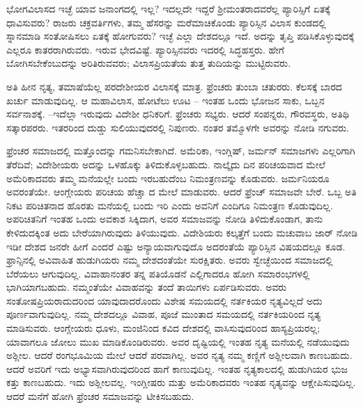 ಭೋಗವಿಲಾಸದ ಇಚ್ಛೆ ಯಾವ ಜನಾಂಗದಲ್ಲಿ ಇಲ್ಲ? ಇದಲ್ಲದೇ ಇದ್ದರೆ ಶ‍್ರೀಮಂತ\break ರಾದವರೆಲ್ಲ ಪ್ಯಾರಿಸ್ಸಿಗೆ ಏತಕ್ಕೆ ಧಾವಿಸುವರು? ರಾಜರು ಚಕ್ರವರ್ತಿಗಳು, ತಮ್ಮ ಹೆಸರನ್ನು ಮರೆಮಾಚಿಕೊಂಡು ಪ್ಯಾರಿಸ್ಸಿನ ವಿಲಾಸ ಕುಂಡದಲ್ಲಿ ಸ್ನಾನಮಾಡಿ ಸಂತೋಷಿಸಲು ಏತಕ್ಕೆ ಹೋಗುವರು? ಇಚ್ಛೆ ಎಲ್ಲಾ ದೇಶದಲ್ಲೂ ಇದೆ. ಅದನ್ನು ತೃಪ್ತಿ ಪಡಿಸಿಕೊಳ್ಳುವುದಕ್ಕೆ ಎಲ್ಲರೂ ಕಾತರರಾಗಿರುವರು. ಇರುವ ಭೇದವಿಷ್ಟೆ. ಪ್ಯಾರಿಸ್ಸಿನವರು ಇದರಲ್ಲಿ ಸಿದ್ಧಹಸ್ತರು. ಹೇಗೆ ಬೋಗಿಸಬೇಕೆಂಬುದನ್ನು ಅರಿತಿರುವವರು; ವಿಲಾಸಪ್ರಿಯತೆಯ ತುತ್ತ ತುದಿಯನ್ನು ಮುಟ್ಟಿರುವರು.

ಅತಿ ಹೀನ ನೃತ್ಯ, ತಮಾಷೆಯೆಲ್ಲ ಪರದೇಶೀಯರ ವಿಲಾಸಕ್ಕೆ ಮಾತ್ರ. ಫ್ರೆಂಚರು ತುಂಬಾ ಚತುರರು. ಕೆಲಸಕ್ಕೆ ಬಾರದ ಖರ್ಚು ಮಾಡುವುದಿಲ್ಲ. ಆ ಮಹಾವಿಲಾಸ, ಹೋಟೆಲು ಊಟ – ಇಂತಹ ಒಂದು ಭೋಜನ ಸಾಕು, ಒಬ್ಬನ ಸರ್ವನಾಶಕ್ಕೆ. –ಇದೆಲ್ಲಾ ಇರುವುದು ವಿದೇಶೀ ಧನಿಕರಿಗೆ. ಫ್ರೆಂಚರು ಸಭ್ಯರು. ಆದರೆ ಸಂಪನ್ನರು, ಗೌರವಸ್ಥರು, ಅತಿಥಿ ಸತ್ಕಾರಪರರು. ಇತರರಿಂದ ದುಡ್ಡು ಸುಲಿಯುವುದರಲ್ಲಿ ನಿಪುಣರು. ನಂತರ ತಮ್ಮೊಳಗೇ ಅವರನ್ನು ನೋಡಿ ನಗುವರು.

\vskip 5pt

ಫ್ರೆಂಚರ ಸಮಾಜದಲ್ಲಿ ಮತ್ತೊಂದನ್ನು ಗಮನಿಸಬೇಕಾಗಿದೆ. ಅಮೆರಿಕಾ, ಇಂಗ್ಲಿಷ್​, ಜರ್ಮನ್​ ಸಮಾಜಗಳು ಎಲ್ಲರಿಗಾಗಿ ತೆರೆದಿವೆ; ವಿದೇಶೀಯರು ಅದನ್ನು ಒಳಹೊಕ್ಕು ತಿಳಿದುಕೊಳ್ಳಬಹುದು. ನಾಲ್ಕೈದು ದಿನ ಪರಿಚಯವಾದ ಮೇಲೆ ಅಮೆರಿಕಾದವರು ತಮ್ಮ ಮನೆಯಲ್ಲೇ ಬಂದು ಇರಬಹುದೆಂಬ ನಿಮಂತ್ರಣವನ್ನು ಕೊಡುವರು. ಜರ್ಮನಿಯರೂ ಅವರಂತೆಯೇ. ಆಂಗ್ಲೇಯರು ಪರಿಚಯ ಹೆಚ್ಚಾ ದ ಮೇಲೆ ಮಾಡುವರು. ಆದರೆ ಫ್ರೆಂಚ್​ ಸಮಾಜವೇ ಬೇರೆ. ಒಬ್ಬ ಅತಿ ನಿಕಟ ಪರಿಚಿತನಾದ ಹೊರತು ಮನೆಯಲ್ಲಿ ಬಂದು ಇರಿ ಎಂದು ಅವನಿಗೆ ಎಂದಿಗೂ ನಿಮಂತ್ರಣ ಕೊಡುವುದಿಲ್ಲ. ಅಪರಿಚಿತನಿಗೆ ಇಂತಹ ಒಂದು ಅವಕಾಶ ಸಿಕ್ಕಿದಾಗ, ಅವರ ಸಮಾಜವನ್ನು ನೋಡಿ ತಿಳಿದುಕೊಂಡಾಗ, ತಾನು ಕೇಳಿದುದಕ್ಕಿಂತ ಅದು ಬೇರೆಯಾಗಿರುವುದು ತಿಳಿಯುವುದು. ವಿದೇಶಿಯರು ಕಲ್ಕತ್ತೆಗೆ ಬಂದು ಮಚುವಾಬ ಜಾರ್​ ನೋಡಿ ಇಡೀ ದೇಶದ ಜನರೇ ಹೀಗೆ ಎಂದರೆ ಎಷ್ಟು ಅನ್ಯಾಯವಾಗುವುದೊ ಅದರಂತೆಯೆ ಪ್ಯಾರಿಸ್ಸಿನ ವಿಷಯದಲ್ಲೂ ಕೂಡ. ಫ್ರಾನ್ಸಿನಲ್ಲಿ ಅವಿವಾಹಿತ ಹುಡುಗಿಯರು ನಮ್ಮ ದೇಶದಂತೆಯೇ ಸುರಕ್ಷಿತರು. ಅವರು ಸ್ವೇಚ್ಛೆಯಿಂದ ಸಮಾಜದಲ್ಲಿ ಬೆರೆಯಲು ಆಗುವುದಿಲ್ಲ. ವಿವಾಹಾನಂತರ ತನ್ನ ಪತಿಯೊಡನೆ ಎಲ್ಲಿಗಾದರೂ ಹೋಗಿ ಸಮಾರಂಭಗಳಲ್ಲಿ ಭಾಗಿಯಾಗಬಹುದು. ನಮ್ಮಂತೆಯೇ ವಿವಾಹವನ್ನು ತಂದೆ ತಾಯಿಗಳು ಏರ್ಪಡಿಸುವರು. ಅವರು ಸಂತೋಷಪ್ರಿಯರಾದುದರಿಂದ ಯಾವುದಾದರೊಂದು ವಿಶೇಷ ಸಮಯದಲ್ಲಿ ನರ್ತಕಿಯರ ನೃತ್ಯವಿಲ್ಲದೆ ಅದು ಪೂರ್ಣವಾಗುವುದಿಲ್ಲ. ನಮ್ಮ ದೇಶದಲ್ಲೂ ವಿವಾಹ, ಪೂಜೆ ಮುಂತಾದ ಸಮಯದಲ್ಲಿ ನರ್ತಕಿಯರಿಂದ ನೃತ್ಯ ಮಾಡಿಸುವರು. ಆಂಗ್ಲೇಯರು ಧೂಳು, ಮಂಜಿನಿಂದ ಕವಿದ ದೇಶದಲ್ಲಿ ವಾಸಿಸುವುದರಿಂದ ಹಾಸ್ಯಪ್ರಿಯರಲ್ಲ; ಯಾವಾಗಲೂ ಜೋಲು ಮುಖ ಮಾಡಿಕೊಂಡಿರುವರು. ಅವರ ದೃಷ್ಟಿಯಲ್ಲಿ ಇಂತಹ ನೃತ್ಯ ಮನೆಯಲ್ಲಿ ನಡೆಯುವುದು ಅಶ್ಲೀಲ. ಆದರೆ ರಂಗಭೂಮಿಯ ಮೇಲೆ ಆದರೆ ಪರವಾಗಿಲ್ಲ. ಅವರ ನೃತ್ಯ ನಮ್ಮ ಕಣ್ಣಿಗೆ ಅಶ್ಲೀಲವಾಗಿ ಕಾಣಬಹುದು. ಆದರೆ ಅವರಿಗೆ ಇದು ಅಭ್ಯಾಸವಾಗಿರುವುದರಿಂದ ಹಾಗೆ ಕಾಣುವುದಿಲ್ಲ. ಇಂತಹ ನೃತ್ಯಕಾಲದಲ್ಲಿ ಹುಡುಗಿಯರ ಭುಜ ಕತ್ತು ಕಾಣಬಹುದು. ಇದು ಅಶ್ಲೀಲವಲ್ಲ. ಇಂಗ್ಲೀಷರು ಮತ್ತು ಅಮೆರಿಕಾದವರು ಇಂತಹ ನೃತ್ಯವನ್ನು ಆಕ್ಷೇಪಿಸುವುದಿಲ್ಲ. ಆದರೆ ಮನೆಗೆ ಹೋಗಿ ಫ್ರೆಂಚರ ಸಮಾಜವನ್ನು ಟೀಕಿಸಬಹುದು.

